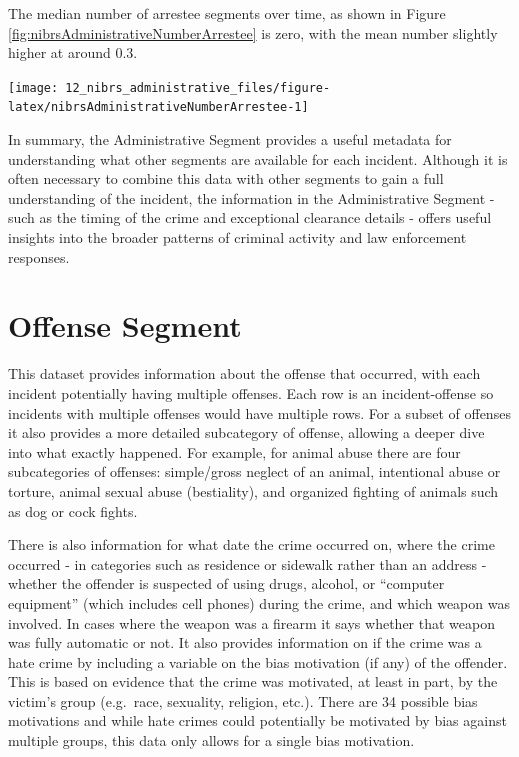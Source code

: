 \documentclass[
]{krantz}
\let\origfigure\figure
\let\endorigfigure\endfigure
\renewenvironment{figure}[1][2] {
    \expandafter\origfigure\expandafter[H]
} {
    \endorigfigure
}
\begin{document}
The median number of arrestee segments over time, as shown
in Figure \ref{fig:nibrsAdministrativeNumberArrestee} is
zero, with the mean number slightly higher at around 0.3.

\begin{figure}

{\centering \texttt{[image: 12\_nibrs\_administrative\_files/figure-latex/nibrsAdministrativeNumberArrestee-1]} 

}

\caption{Annual mean and median number of Arrestee Segments, 1991-2022.}\label{fig:nibrsAdministrativeNumberArrestee}
\end{figure}

In summary, the Administrative Segment provides a useful
metadata for understanding what other segments are available
for each incident. Although it is often necessary to combine
this data with other segments to gain a full understanding
of the incident, the information in the Administrative
Segment - such as the timing of the crime and exceptional
clearance details - offers useful insights into the broader
patterns of criminal activity and law enforcement responses.

\chapter{Offense Segment}\label{offenseSegment}

This dataset provides information about the offense that
occurred, with each incident potentially having multiple
offenses. Each row is an incident-offense so incidents with
multiple offenses would have multiple rows. For a subset of
offenses it also provides a more detailed subcategory of
offense, allowing a deeper dive into what exactly happened.
For example, for animal abuse there are four subcategories
of offenses: simple/gross neglect of an animal, intentional
abuse or torture, animal sexual abuse (bestiality), and
organized fighting of animals such as dog or cock fights.

There is also information for what date the crime occurred
on, where the crime occurred - in categories such as
residence or sidewalk rather than an address - whether the
offender is suspected of using drugs, alcohol, or ``computer
equipment'' (which includes cell phones) during the crime,
and which weapon was involved. In cases where the weapon was
a firearm it says whether that weapon was fully automatic or
not. It also provides information on if the crime was a hate
crime by including a variable on the bias motivation (if
any) of the offender. This is based on evidence that the
crime was motivated, at least in part, by the victim's group
(e.g.~race, sexuality, religion, etc.). There are 34
possible bias motivations and while hate crimes could
potentially be motivated by bias against multiple groups,
this data only allows for a single bias motivation.
\end{document}
